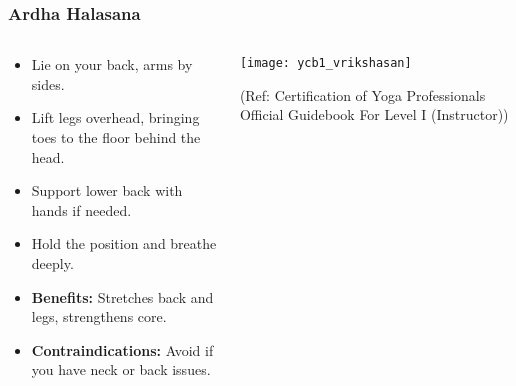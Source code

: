 \begin{frame}[fragile]\frametitle{Ardha Halasana}
\begin{columns}
    \begin{column}[T]{0.5\linewidth}
      \begin{itemize}
        \item Lie on your back, arms by sides.
        \item Lift legs overhead, bringing toes to the floor behind the head.
        \item Support lower back with hands if needed.
        \item Hold the position and breathe deeply.
        \item \textbf{Benefits:} Stretches back and legs, strengthens core.
        \item \textbf{Contraindications:} Avoid if you have neck or back issues.
      \end{itemize}
    \end{column}
    \begin{column}[T]{0.5\linewidth}
        \begin{center}
        \begin{center}
		        \texttt{[image: ycb1\_vrikshasan]}
				
				{\tiny (Ref: Certification  of Yoga Professionals Official Guidebook For Level I (Instructor))}	        
		\end{center}   
        \end{center}    
    \end{column}
  \end{columns}
\end{frame}

